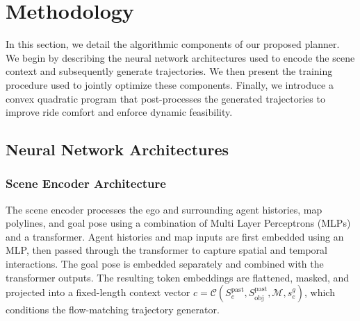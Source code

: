 \documentclass[conference]{IEEEtran}
\begin{document}
\section{Methodology}
In this section, we detail the algorithmic components of our proposed planner. We begin by describing the neural network architectures used to encode the scene context and subsequently generate trajectories. We then present the training procedure used to jointly optimize these components. Finally, we introduce a convex quadratic program that post-processes the generated trajectories to improve ride comfort and enforce dynamic feasibility.

\subsection{Neural Network Architectures}
\subsubsection*{Scene Encoder Architecture}
The scene encoder processes the ego and surrounding agent histories, map polylines, and goal pose using a combination of Multi Layer Perceptrons (MLPs) and a transformer. Agent histories and map inputs are first embedded using an MLP, then passed through the transformer to capture spatial and temporal interactions. The goal pose is embedded separately and combined with the transformer outputs. The resulting token embeddings are flattened, masked, and projected into a fixed-length context vector \(c = \mathcal{C}(S^{\text{past}}_e, S^{\text{past}}_{\text{obj}}, \mathcal{M}, s^g_e)\), which conditions the flow-matching trajectory generator.

\end{document}
